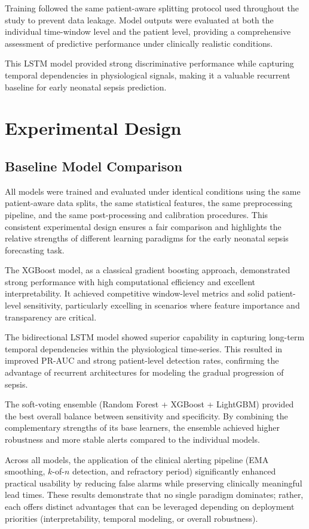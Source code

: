 \documentclass[conference]{IEEEtran}
\begin{document}
Training followed the same patient-aware splitting protocol 
used throughout the study to prevent data leakage. Model 
outputs were evaluated at both the individual time-window 
level and the patient level, providing a comprehensive 
assessment of predictive performance under clinically 
realistic conditions.

This LSTM model provided strong discriminative performance 
while capturing temporal dependencies in physiological 
signals, making it a valuable recurrent baseline for early 
neonatal sepsis prediction.


\section{Experimental Design}

\subsection{Baseline Model Comparison}
All models were trained and evaluated under identical conditions using the same patient-aware data splits, the same statistical features, the same preprocessing pipeline, and the same post-processing and calibration procedures. This consistent experimental design ensures a fair comparison and highlights the relative strengths of different learning paradigms for the early neonatal sepsis forecasting task.

The XGBoost model, as a classical gradient boosting approach, demonstrated strong performance with high computational efficiency and excellent interpretability. It achieved competitive window-level metrics and solid patient-level sensitivity, particularly excelling in scenarios where feature importance and transparency are critical.

The bidirectional LSTM model showed superior capability in capturing long-term temporal dependencies within the physiological time-series. This resulted in improved PR-AUC and strong patient-level detection rates, confirming the advantage of recurrent architectures for modeling the gradual progression of sepsis.

The soft-voting ensemble (Random Forest + XGBoost + LightGBM) provided the best overall balance between sensitivity and specificity. By combining the complementary strengths of its base learners, the ensemble achieved higher robustness and more stable alerts compared to the individual models.

Across all models, the application of the clinical alerting pipeline (EMA smoothing, $k$-of-$n$ detection, and refractory period) significantly enhanced practical usability by reducing false alarms while preserving clinically meaningful lead times. These results demonstrate that no single paradigm dominates; rather, each offers distinct advantages that can be leveraged depending on deployment priorities (interpretability, temporal modeling, or overall robustness).
\end{document}
